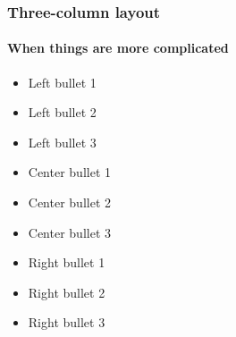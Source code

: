 \begin{frame}[t]
    \frametitle{Three-column layout}
    \framesubtitle{When things are more complicated}

    \threecolumnlayout
    {
        \begin{itemize}
            \item Left bullet 1
            \item Left bullet 2
            \item Left bullet 3
        \end{itemize}
    }
    {
        \begin{itemize}
            \item Center bullet 1
            \item Center bullet 2
            \item Center bullet 3
        \end{itemize}
    }{
        \begin{itemize}
            \item Right bullet 1
            \item Right bullet 2
            \item Right bullet 3
        \end{itemize}
    }
\end{frame}